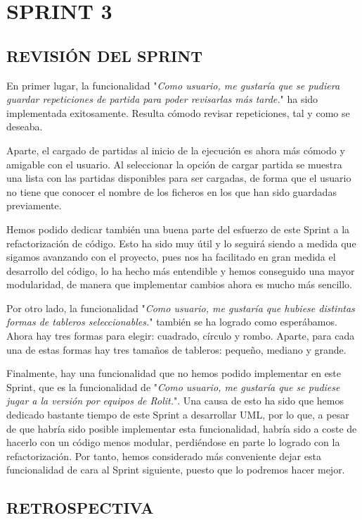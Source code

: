 \documentclass[../../SCRUM.tex]{subfiles}
\begin{document}
\section{SPRINT 3}
\subsection{REVISIÓN DEL SPRINT}
En primer lugar, la funcionalidad "\textit{Como usuario, me gustaría que se pudiera guardar repeticiones de partida para poder revisarlas más tarde.}" ha sido implementada exitosamente. Resulta cómodo revisar repeticiones, tal y como se deseaba.

Aparte, el cargado de partidas al inicio de la ejecución es ahora más cómodo y amigable con el usuario. Al seleccionar la opción de cargar partida se muestra una lista con las partidas disponibles para ser cargadas, de forma que el usuario no tiene que conocer el nombre de los ficheros en los que han sido guardadas previamente.

Hemos podido dedicar también una buena parte del esfuerzo de este Sprint a la refactorización de código. Esto ha sido muy útil y lo seguirá siendo a medida que sigamos avanzando con el proyecto, pues nos ha facilitado en gran medida el desarrollo del código, lo ha hecho más entendible y hemos conseguido una mayor modularidad, de manera que implementar cambios ahora es mucho más sencillo.

Por otro lado, la funcionalidad "\textit{Como usuario, me gustaría que hubiese distintas formas de tableros seleccionables.}" también se ha logrado como esperábamos. Ahora hay tres formas para elegir: cuadrado, círculo y rombo. Aparte, para cada una de estas formas hay tres tamaños de tableros: pequeño, mediano y grande.

Finalmente, hay una funcionalidad que no hemos podido implementar en este Sprint, que es la funcionalidad de "\textit{Como usuario, me  gustaría que se pudiese jugar a la versión por equipos de Rolit.}". Una causa de esto ha sido que hemos dedicado bastante tiempo de este Sprint a desarrollar UML, por lo que, a pesar de que habría sido posible implementar esta funcionalidad, habría sido a coste de hacerlo con un código menos modular, perdiéndose en parte lo logrado con la refactorización. Por tanto, hemos considerado más conveniente dejar esta funcionalidad de cara al Sprint siguiente, puesto que lo podremos hacer mejor.

\subsection{RETROSPECTIVA}
\end{document}
